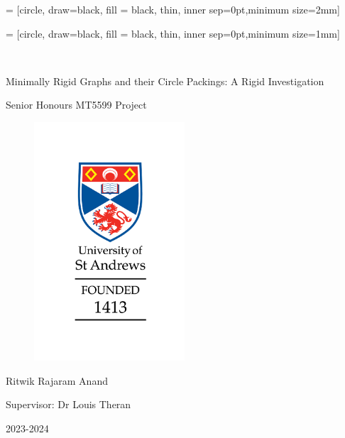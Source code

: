  = [circle, draw=black, fill = black, thin, inner sep=0pt,minimum size=2mm]

 = [circle, draw=black, fill = black, thin, inner sep=0pt,minimum size=1mm]


\thispagestyle{empty}

{%

\centering
\Large

~\vspace{\fill}

{\huge 
Minimally Rigid Graphs and their Circle Packings: A Rigid Investigation
}

{\small
Senior Honours MT5599 Project
}

\begin{figure}[htbp]
    \centering
    \includegraphics[width = 0.5\textwidth]{St Andrews Logo.png}
\end{figure}

\vspace{0.5mm}

{\LARGE
Ritwik Rajaram Anand
}

{\small
Supervisor: Dr Louis Theran
}

{\large 2023-2024}

\vspace{\fill}





}%

\cleardoublepage

